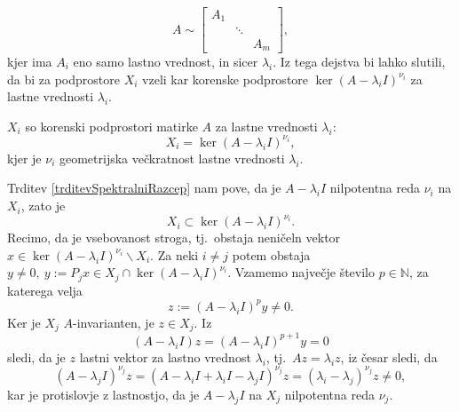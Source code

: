 \documentclass[mat1]{fmfdelo}
\newcommand{\N}{\mathbb N}
\begin{document}
\begin{equation*}
    A \sim
    \begin{bmatrix}
       A_1 & & \\
       & \ddots & \\
       & & A_m 
    \end{bmatrix},
\end{equation*}
kjer ima $A_i$ eno samo lastno vrednost, in sicer $\lambda_i$. Iz tega dejstva bi lahko slutili, da bi za podprostore $X_i$ vzeli kar korenske podprostore $\ker (A - \lambda_i I)^{\nu_i}$ za lastne vrednosti $\lambda_i$.
\begin{trditev}
    $X_i$ so korenski podprostori matirke $A$ za lastne vrednosti $\lambda_i$:
    \begin{equation*}
        X_i = \ker (A - \lambda_i I)^{\nu_i},
    \end{equation*}
    kjer je $\nu_i$ geometrijska večkratnost lastne vrednosti $\lambda_i$.
\end{trditev}
\begin{dokaz}
    Trditev \ref{trditevSpektralniRazcep} nam pove, da je $A - \lambda_i I$ nilpotentna reda $\nu_i$ na $X_i$, zato je
    \begin{equation} \label{strogaVsebovanost}
        X_i \subset \ker (A - \lambda_i I)^{\nu_i}.
    \end{equation}
    Recimo, da je vsebovanost stroga, tj.\ obstaja neničeln vektor $x \in \ker (A - \lambda_i I)^{\nu_i} \backslash X_i$. Za neki $i \neq j$ potem obstaja $y \neq 0,\ y := P_j x \in X_j \cap \ker (A - \lambda_i I)^{\nu_i}$. Vzamemo največje število $p \in \N$, za katerega velja
    \begin{equation*}
        z := (A - \lambda_i I)^p y \neq 0.
    \end{equation*}
    Ker je $X_j$ $A$-invarianten, je $z \in X_j$. Iz
    \begin{equation*}
        (A - \lambda_i I) z = (A - \lambda_i I)^{p+1} y = 0
    \end{equation*}
    sledi, da je $z$ lastni vektor za lastno vrednost $\lambda_i$, tj.\ $A z = \lambda_i z$, iz česar sledi, da
    \begin{equation*}
        (A - \lambda_j I)^{\nu_j} z = \left(A - \lambda_i I + \lambda_i I - \lambda_j I\right)^{\nu_j} z = (\lambda_i - \lambda_j)^{\nu_j} z \neq 0,
    \end{equation*}
    kar je protislovje z lastnostjo, da je $A - \lambda_j I$ na $X_j$ nilpotentna reda $\nu_j$.
\end{dokaz}
\end{document}
